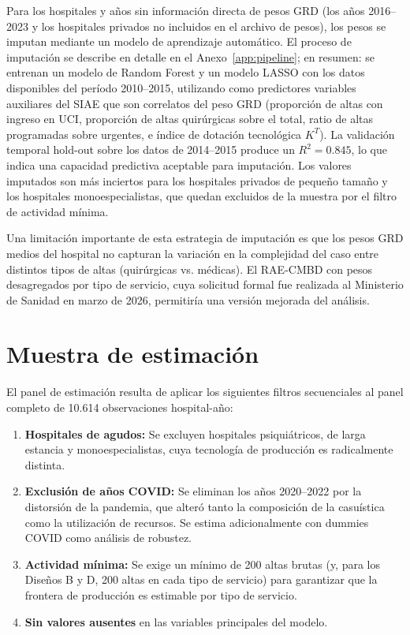 \documentclass[12pt, a4paper, twoside, openright]{book}
\theoremstyle{plain}
\theoremstyle{definition}
\theoremstyle{remark}
\begin{document}
Para los hospitales y años sin información directa de pesos GRD (los años 2016--2023 y los hospitales privados no incluidos en el archivo de pesos), los pesos se imputan mediante un modelo de aprendizaje automático. El proceso de imputación se describe en detalle en el Anexo~\ref{app:pipeline}; en resumen: se entrenan un modelo de Random Forest y un modelo LASSO con los datos disponibles del período 2010--2015, utilizando como predictores variables auxiliares del SIAE que son correlatos del peso GRD (proporción de altas con ingreso en UCI, proporción de altas quirúrgicas sobre el total, ratio de altas programadas sobre urgentes, e índice de dotación tecnológica $K^T$). La validación temporal hold-out sobre los datos de 2014--2015 produce un $R^2 = 0.845$, lo que indica una capacidad predictiva aceptable para imputación. Los valores imputados son más inciertos para los hospitales privados de pequeño tamaño y los hospitales monoespecialistas, que quedan excluidos de la muestra por el filtro de actividad mínima.

Una limitación importante de esta estrategia de imputación es que los pesos GRD medios del hospital no capturan la variación en la complejidad del caso entre distintos tipos de altas (quirúrgicas vs. médicas). El RAE-CMBD con pesos desagregados por tipo de servicio, cuya solicitud formal fue realizada al Ministerio de Sanidad en marzo de 2026, permitiría una versión mejorada del análisis.

\section{Muestra de estimación}

El panel de estimación resulta de aplicar los siguientes filtros secuenciales al panel completo de 10.614 observaciones hospital-año:

\begin{enumerate}
  \item \textbf{Hospitales de agudos:} Se excluyen hospitales psiquiátricos, de larga estancia y monoespecialistas, cuya tecnología de producción es radicalmente distinta.
  \item \textbf{Exclusión de años COVID:} Se eliminan los años 2020--2022 por la distorsión de la pandemia, que alteró tanto la composición de la casuística como la utilización de recursos. Se estima adicionalmente con dummies COVID como análisis de robustez.
  \item \textbf{Actividad mínima:} Se exige un mínimo de 200 altas brutas (y, para los Diseños B y D, 200 altas en cada tipo de servicio) para garantizar que la frontera de producción es estimable por tipo de servicio.
  \item \textbf{Sin valores ausentes} en las variables principales del modelo.
\end{enumerate}
\end{document}
